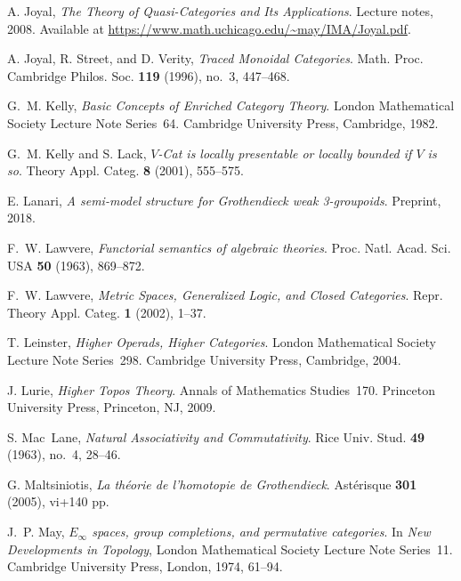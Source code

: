 \documentclass{tac}
\begin{document}
\begin{references*}
A. Joyal,
\emph{The Theory of Quasi-Categories and Its Applications}.
Lecture notes, 2008.
Available at \url{https://www.math.uchicago.edu/~may/IMA/Joyal.pdf}.

A. Joyal, R. Street, and D. Verity,
\emph{Traced Monoidal Categories}.
Math. Proc. Cambridge Philos. Soc. \textbf{119} (1996), no.~3, 447--468.

G.~M. Kelly,
\emph{Basic Concepts of Enriched Category Theory}.
London Mathematical Society Lecture Note Series~64.
Cambridge University Press, Cambridge, 1982.

G.~M. Kelly and S. Lack,
\emph{$V$-Cat is locally presentable or locally bounded if $V$ is so}.
Theory Appl. Categ. \textbf{8} (2001), 555--575.

E. Lanari,
\emph{A semi-model structure for Grothendieck weak 3-groupoids}.
Preprint, 2018.

F.~W. Lawvere,
\emph{Functorial semantics of algebraic theories}.
Proc. Natl. Acad. Sci. USA \textbf{50} (1963), 869--872.

F.~W. Lawvere,
\emph{Metric Spaces, Generalized Logic, and Closed Categories}.
Repr. Theory Appl. Categ. \textbf{1} (2002), 1--37.

T. Leinster,
\emph{Higher Operads, Higher Categories}.
London Mathematical Society Lecture Note Series~298.
Cambridge University Press, Cambridge, 2004.

J. Lurie,
\emph{Higher Topos Theory}.
Annals of Mathematics Studies~170.
Princeton University Press, Princeton, NJ, 2009.

S. Mac~Lane,
\emph{Natural Associativity and Commutativity}.
Rice Univ. Stud. \textbf{49} (1963), no.~4, 28--46.

G. Maltsiniotis,
\emph{La th\'eorie de l'homotopie de Grothendieck}.
Ast\'erisque \textbf{301} (2005), vi+140 pp.

J.~P. May,
\emph{$E_\infty$ spaces, group completions, and permutative categories}.
In \emph{New Developments in Topology},
London Mathematical Society Lecture Note Series~11.
Cambridge University Press, London, 1974, 61--94.


\end{references*}
\end{document}
